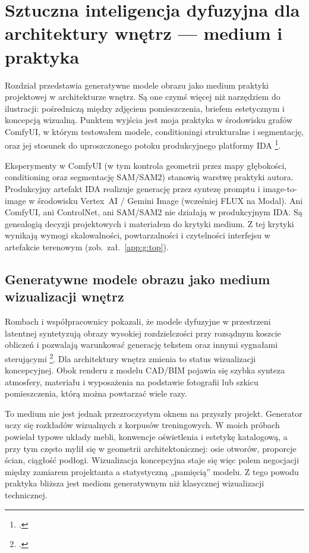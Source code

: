 \chapter{Sztuczna inteligencja dyfuzyjna dla architektury wnętrz --- medium i praktyka}
\label{ch04:top}

Rozdział przedstawia generatywne modele obrazu jako medium praktyki projektowej w architekturze wnętrz. Są one czymś więcej niż narzędziem do ilustracji: pośredniczą między zdjęciem pomieszczenia, briefem estetycznym i koncepcją wizualną.
Punktem wyjścia jest moja praktyka w środowisku grafów ComfyUI, w którym testowałem modele, conditioningi strukturalne i segmentację, oraz jej stosunek do uproszczonego potoku produkcyjnego platformy IDA \footcite{idaPlatform2026}.

Eksperymenty w ComfyUI (w tym kontrola geometrii przez mapy głębokości, conditioning oraz segmentację SAM/SAM2) stanowią warstwę praktyki autora. Produkcyjny artefakt IDA realizuje generację przez syntezę promptu i image-to-image w środowisku Vertex~AI / Gemini Image (wcześniej FLUX na Modal).
Ani ComfyUI, ani ControlNet, ani SAM/SAM2 nie działają w produkcyjnym IDA. Są genealogią decyzji projektowych i materiałem do krytyki medium. Z tej krytyki wynikają wymogi skalowalności, powtarzalności i czytelności interfejsu w artefakcie terenowym (zob.\ zał.~\ref{app:g:top}).

\section{Generatywne modele obrazu jako medium wizualizacji wnętrz}
\label{ch04:sec:genai-medium}

Rombach i współpracownicy pokazali, że modele dyfuzyjne w przestrzeni latentnej syntetyzują obrazy wysokiej rozdzielczości przy rozsądnym koszcie obliczeń i pozwalają warunkować generację tekstem oraz innymi sygnałami sterującymi \footcite{rombach2022ldm}.
Dla architektury wnętrz zmienia to status wizualizacji koncepcyjnej. Obok renderu z modelu CAD/BIM pojawia się szybka synteza atmosfery, materiału i wyposażenia na podstawie fotografii lub szkicu pomieszczenia, którą można powtarzać wiele razy.

To medium nie jest jednak przezroczystym oknem na przyszły projekt. Generator uczy się rozkładów wizualnych z korpusów treningowych.
W moich próbach powielał typowe układy mebli, konwencje oświetlenia i estetykę katalogową, a przy tym często mylił się w geometrii architektonicznej: osie otworów, proporcje ścian, ciągłość podłogi.
Wizualizacja koncepcyjna staje się więc polem negocjacji między zamiarem projektanta a statystyczną „pamięcią” modelu. Z tego powodu praktyka bliższa jest mediom generatywnym niż klasycznej wizualizacji technicznej.


